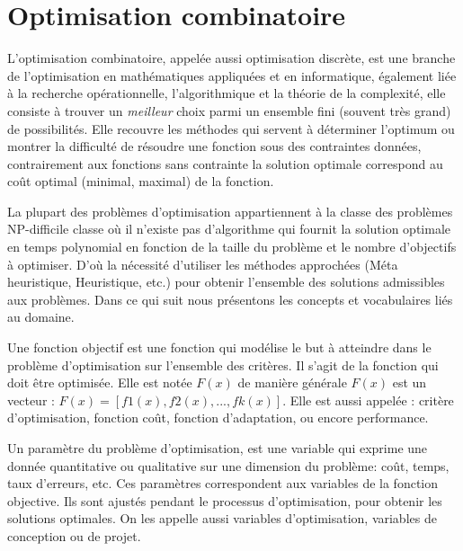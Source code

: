 
\section{Optimisation combinatoire}
	L'optimisation combinatoire, appelée  aussi optimisation discrète, est une branche de l'optimisation en mathématiques appliquées et en informatique, également liée à la recherche opérationnelle, l'algorithmique et la théorie de la complexité, elle consiste à trouver un \emph{meilleur} choix parmi un ensemble fini (souvent très grand) de possibilités. Elle recouvre les méthodes qui servent à déterminer l'optimum ou montrer la difficulté de résoudre une fonction sous des contraintes données, contrairement aux fonctions sans contrainte la solution optimale correspond au coût optimal (minimal, maximal) de la fonction.

	La plupart des problèmes d'optimisation appartiennent à la classe des problèmes NP-difficile classe où il n'existe pas d'algorithme qui fournit la solution optimale en temps polynomial en fonction de la taille du problème et le nombre d'objectifs à optimiser. D'où la nécessité d'utiliser les méthodes approchées (Méta heuristique, Heuristique, etc.) pour obtenir l'ensemble des solutions admissibles aux problèmes.
 Dans ce qui suit nous présentons les concepts et vocabulaires liés au domaine.


\begin{definition}
	Une fonction objectif est une fonction qui modélise le but à atteindre dans le problème d'optimisation sur l'ensemble des critères. Il s'agit de la fonction qui doit être optimisée. Elle est notée $F(x)$ de manière générale $F(x)$ est un vecteur :
$F(x)= [f1(x), f2(x),..., fk(x)]$. Elle est aussi appelée : critère d'optimisation, fonction coût, fonction d'adaptation, ou encore performance.
\end{definition}

\begin{definition}[Paramètres]
	Un paramètre du problème d'optimisation, est une variable qui exprime une donnée quantitative ou qualitative sur une dimension du problème: coût, temps, taux d'erreurs, etc. Ces paramètres correspondent aux variables de la fonction objective. Ils sont ajustés pendant le processus d'optimisation, pour obtenir les solutions optimales. On les appelle aussi variables d'optimisation, variables de conception ou de projet.
\end{definition}

